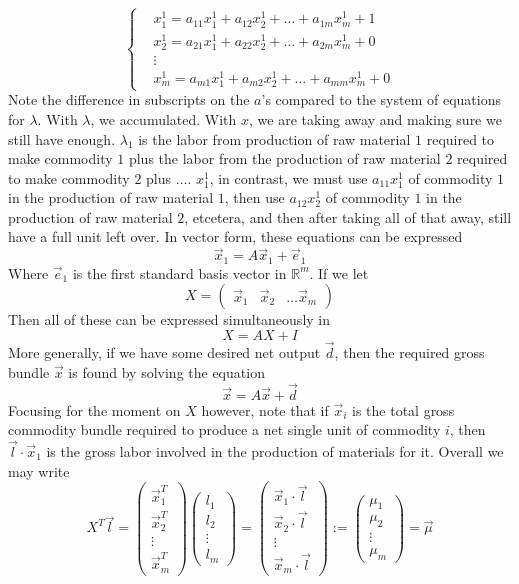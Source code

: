 \documentclass{article}
\theoremstyle{definition}
\theoremstyle{plain}
\theoremstyle{theorem}
\begin{document}
\[ \begin{cases}
	& x_1^1 = a_{11}x_1^1 + a_{12}x_2^1 + \ldots + a_{1m}x_m^1 + 1 \\
	& x_2^1 = a_{21}x_1^1 + a_{22}x_2^1 + \ldots + a_{2m}x_m^1 + 0 \\
	& \vdots \\
	& x_m^1 = a_{m1}x_1^1 + a_{m2}x_2^1 + \ldots + a_{mm}x_m^1 + 0  
\end{cases} \]
Note the difference in subscripts on the $a$'s compared to the system of equations for $\lambda$. With $\lambda$, we accumulated. With $x$, we are taking away and making sure we still have enough. $\lambda_1$ is the labor from production of raw material $1$ required to make commodity $1$ plus the labor from the production of raw material $2$ required to make commodity $2$ plus $\ldots$. $x_1^1$, in contrast, we must use $a_{11}x_1^1$ of commodity $1$ in the production of raw material $1$, then use $a_{12}x_2^1$ of commodity $1$ in the production of raw material $2$, etcetera, and then after taking all of that away, still have a full unit left over. In vector form, these equations can be expressed
\[\vec{x}_1 = A\vec{x}_1 + \vec{e}_1 \]
Where $\vec{e}_1$ is the first standard basis vector in $\mathbb{R}^m$. If we let 
 \[ X = \begin{pmatrix} \vec{x}_1 & \vec{x}_2 & \ldots \vec{x}_m \end{pmatrix} \]
Then all of these can be expressed simultaneously in
\[ X = AX + I \]
More generally, if we have some desired net output $\vec{d}$, then the required gross bundle $\vec{x}$ is found by solving the equation
\[ \vec{x} = A\vec{x} + \vec{d} \]
Focusing for the moment on $X$ however, note that if $\vec{x}_i$ is the total gross commodity bundle required to produce a net single unit of commodity $i$, then $\vec{l} \cdot \vec{x}_1$ is the gross labor involved in the production of materials for it. Overall we may write
\[ X^T\vec{l} = \begin{pmatrix} \vec{x}_1^T \\ \vec{x}_2^T \\ \vdots \\ \vec{x}_m^T  \end{pmatrix}\begin{pmatrix} l_1 \\ l_2 \\ \vdots \\ l_m \end{pmatrix}
 = \begin{pmatrix} \vec{x}_1 \cdot \vec{l} \\ \vec{x}_2 \cdot \vec{l} \\ \vdots \\ \vec{x}_m \cdot \vec{l} \end{pmatrix} := \begin{pmatrix} \mu_1 \\ \mu_2 \\ \vdots \\ \mu_m \end{pmatrix} = \vec{\mu} \]
\end{document}
